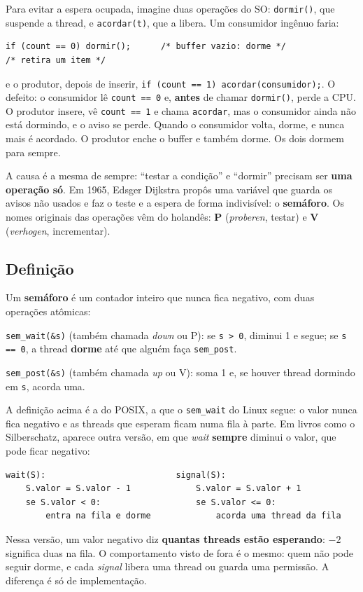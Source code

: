 \documentclass[11pt,a4paper]{article}
\newcommand{\cmd}[1]{\texttt{#1}}
\begin{document}
Para evitar a espera ocupada, imagine duas operações do SO: \cmd{dormir()}, que suspende a thread, e \cmd{acordar(t)}, que a libera. Um consumidor ingênuo faria:

\begin{lstlisting}[style=codigo]
if (count == 0) dormir();      /* buffer vazio: dorme */
/* retira um item */
\end{lstlisting}

e o produtor, depois de inserir, \cmd{if (count == 1) acordar(consumidor);}. O defeito: o consumidor lê \cmd{count == 0} e, \textbf{antes} de chamar \cmd{dormir()}, perde a CPU. O produtor insere, vê \cmd{count == 1} e chama \cmd{acordar}, mas o consumidor ainda não está dormindo, e o aviso se perde. Quando o consumidor volta, dorme, e nunca mais é acordado. O produtor enche o buffer e também dorme. Os dois dormem para sempre.

A causa é a mesma de sempre: ``testar a condição'' e ``dormir'' precisam ser \textbf{uma operação só}. Em 1965, Edsger Dijkstra propôs uma variável que guarda os avisos não usados e faz o teste e a espera de forma indivisível: o \textbf{semáforo}. Os nomes originais das operações vêm do holandês: \textbf{P} (\emph{proberen}, testar) e \textbf{V} (\emph{verhogen}, incrementar).

\subsection{Definição}

\begin{definicao}
Um \textbf{semáforo} é um contador inteiro que nunca fica negativo, com duas operações atômicas:

\cmd{sem\_wait(\&s)} (também chamada \emph{down} ou P): se \cmd{s > 0}, diminui 1 e segue; se \cmd{s == 0}, a thread \textbf{dorme} até que alguém faça \cmd{sem\_post}.

\cmd{sem\_post(\&s)} (também chamada \emph{up} ou V): soma 1 e, se houver thread dormindo em \cmd{s}, acorda uma.
\end{definicao}

\begin{pergunta}
A definição acima é a do POSIX, a que o \cmd{sem\_wait} do Linux segue: o valor nunca fica negativo e as threads que esperam ficam numa fila à parte. Em livros como o Silberschatz, aparece outra versão, em que \emph{wait} \textbf{sempre} diminui o valor, que pode ficar negativo:

\begin{lstlisting}[style=terminal]
wait(S):                          signal(S):
    S.valor = S.valor - 1             S.valor = S.valor + 1
    se S.valor < 0:                   se S.valor <= 0:
        entra na fila e dorme             acorda uma thread da fila
\end{lstlisting}

Nessa versão, um valor negativo diz \textbf{quantas threads estão esperando}: $-2$ significa duas na fila. O comportamento visto de fora é o mesmo: quem não pode seguir dorme, e cada \emph{signal} libera uma thread ou guarda uma permissão. A diferença é só de implementação.
\end{pergunta}
\end{document}
